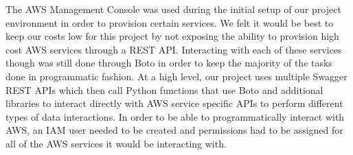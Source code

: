 The AWS Management Console was used during the initial setup of our project 
environment in order to provision certain services. We felt it would be best 
to keep our costs low for this project by not exposing the ability to 
provision high cost AWS services through a REST API. Interacting with each of 
these services though was still done through Boto in order to keep the 
majority of the tasks done in programmatic fashion. At a high level, our 
project uses multiple Swagger REST APIs which then call Python functions that 
use Boto and additional libraries to interact directly with AWS service 
specific APIs to perform different types of data interactions. In order to be 
able to programmatically interact with AWS, an IAM user needed to be created 
and permissions had to be assigned for all of the AWS services it would be 
interacting with.  

